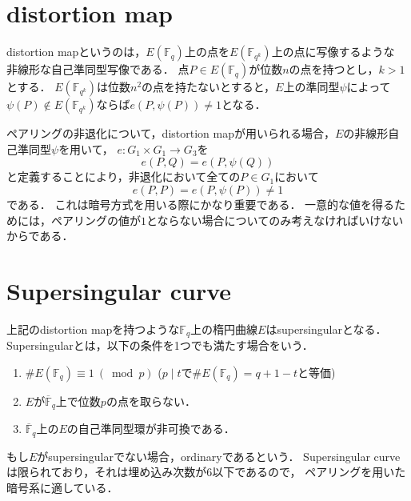 \section{distortion map}
\par

distortion mapというのは，$E(\mathbb{F} _q)$上の点を$E(\mathbb{F} _{q ^k})$上の点に写像するような
非線形な自己準同型写像である．
点$P \in E(\mathbb{F} _q)$が位数$n$の点を持つとし，$k > 1$とする．
$E(\mathbb{F} _{q ^k})$は位数$n ^2$の点を持たないとすると，$E$上の準同型$\psi$によって
$\psi(P) \notin E(\mathbb{F} _{q ^k})$ならば$e(P, \psi(P)) \not= 1$となる．
\par
ペアリングの非退化について，distortion mapが用いられる場合，$E$の非線形自己準同型$\psi$を用いて，
${e} : G _1 \times G _1 \to G _3$を
\[
{e}(P, Q) = {e}(P, \psi(Q))
\]
と定義することにより，非退化において全ての$P \in G _1$において
\[
{e}(P, P) = {e}(P, \psi(P)) \not= 1
\]
である．
これは暗号方式を用いる際にかなり重要である．
一意的な値を得るためには，ペアリングの値が$1$とならない場合についてのみ考えなければいけないからである．\\
\par
\section{Supersingular curve}
\par
上記のdistortion mapを持つような$\mathbb{F} _q$上の楕円曲線$E$はsupersingularとなる．
Supersingularとは，以下の条件を1つでも満たす場合をいう．
\begin{enumerate}
  \item $\# E(\mathbb{F} _q) \equiv 1 \ (\bmod p)$ ($p \mid t$で$\# E(\mathbb{F} _q) = q + 1 - t$と等価)
  \item $E$が$\overline{\mathbb{F}} _q$上で位数$p$の点を取らない．
  \item $\overline{\mathbb{F}} _q$上の$E$の自己準同型環が非可換である．
\end{enumerate}
もし$E$がsupersingularでない場合，ordinaryであるという．
Supersingular curveは限られており，それは埋め込み次数が$6$以下であるので，
ペアリングを用いた暗号系に適している．\\
